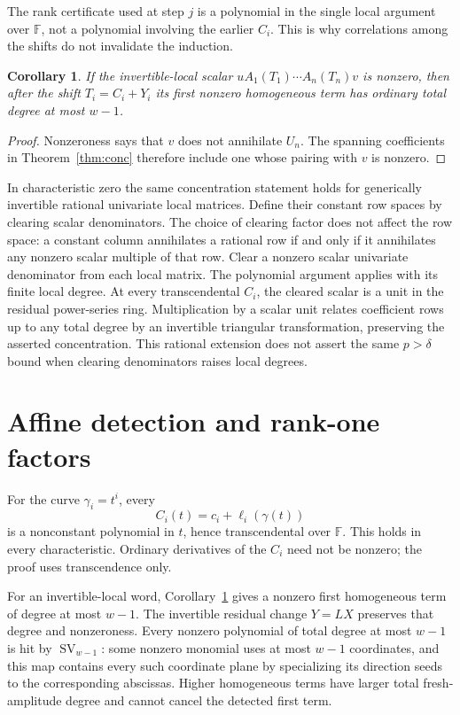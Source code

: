 \documentclass[11pt]{article}
\newtheorem{corollary}[theorem]{Corollary}
\newcommand{\F}{\mathbb F}
\newcommand{\SV}{\operatorname{SV}}
\begin{document}
The rank certificate used at step \(j\) is a polynomial in the
single local argument over \(\F\), not a polynomial involving the
earlier \(C_i\). This is why correlations among the shifts do
not invalidate the induction.

\begin{corollary}\label{cor:scalar}
If the invertible-local scalar \(uA_1(T_1)\cdots A_n(T_n)v\)
is nonzero, then after the shift \(T_i=C_i+Y_i\) its first
nonzero homogeneous term has ordinary total degree at most \(w-1\).
\end{corollary}
\begin{proof}
Nonzeroness says that \(v\) does not annihilate \(U_n\).
The spanning coefficients in Theorem~\ref{thm:conc} therefore
include one whose pairing with \(v\) is nonzero.
\end{proof}

In characteristic zero the same concentration statement holds for
generically invertible rational univariate local matrices.
Define their constant row spaces by clearing scalar denominators.
The choice of clearing factor does not affect the row space:
a constant column annihilates a rational row if and only if it
annihilates any nonzero scalar multiple of that row.
Clear a nonzero scalar univariate denominator from each local
matrix. The polynomial argument applies with its finite local degree.
At every transcendental \(C_i\), the cleared scalar is a unit in
the residual power-series ring. Multiplication by a scalar unit
relates coefficient rows up to any total degree by an invertible
triangular transformation, preserving the asserted concentration.
This rational extension does not assert the same \(p>\delta\)
bound when clearing denominators raises local degrees.

\section{Affine detection and rank-one factors}

For the curve \(\gamma_i=t^i\), every
\[
 C_i(t)=c_i+\ell_i(\gamma(t))
\]
is a nonconstant polynomial in \(t\), hence transcendental over \(\F\).
This holds in every characteristic. Ordinary derivatives of the
\(C_i\) need not be nonzero; the proof uses transcendence only.

For an invertible-local word, Corollary~\ref{cor:scalar} gives a
nonzero first homogeneous term of degree at most \(w-1\).
The invertible residual change \(Y=LX\) preserves that degree
and nonzeroness.
Every nonzero polynomial of total degree at most \(w-1\) is hit by
\(\SV_{w-1}\): some nonzero monomial uses at most \(w-1\)
coordinates, and this map contains every such coordinate plane
by specializing its direction seeds to the corresponding abscissas.
Higher homogeneous terms have larger total fresh-amplitude degree
and cannot cancel the detected first term.
\end{document}
